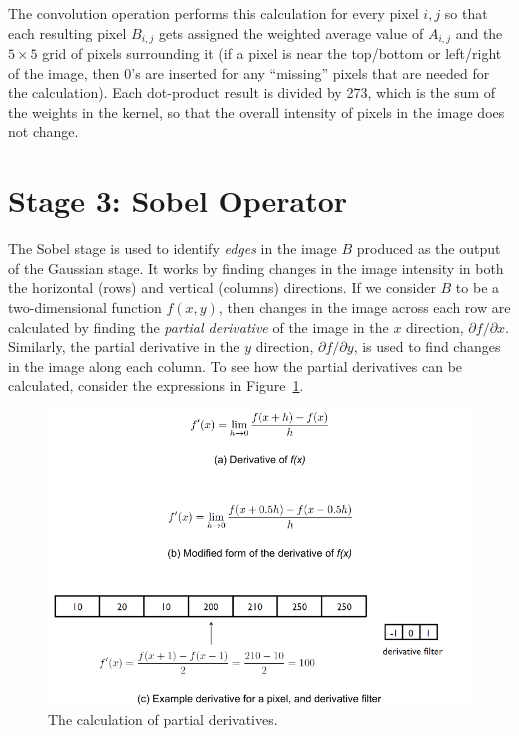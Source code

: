 \documentclass[epsfig,10pt,fullpage]{article}
\begin{document}
\noindent
The convolution operation performs this calculation for every pixel $i, j$ so that 
each resulting pixel $B_{i,j}$ gets assigned the weighted average value of $A_{i,j}$ and 
the $5 \times 5$ grid of pixels surrounding it (if a pixel is near the 
top/bottom or left/right of the image,
then 0's are inserted for any ``missing'' pixels that are needed for the calculation). Each 
dot-product result is divided by 273, which is the sum of the weights in the kernel, 
so that the overall intensity of pixels in the image does not change.

\noindent
\section*{Stage 3: Sobel Operator} 

The Sobel stage is used to identify {\it edges} in the image $B$ produced as the output of
the Gaussian stage. It works by finding changes in the image intensity in both the horizontal
(rows) and vertical (columns) directions. If we consider $B$ to be a two-dimensional
function $f(x,y)$, then changes in the image across each row are calculated by finding the 
{\it partial derivative} of the image in the $x$ direction, 
${\partial f}/{\partial x}$. Similarly, the partial derivative in the $y$ direction, 
${\partial f}/{\partial y}$, is used to find changes in the image along each column. To see 
how the partial derivatives can be calculated, consider the expressions in 
Figure~\ref{fig:derivative}. 

\begin{figure}[h]
   \begin{center}
       \includegraphics[scale = 0.85]{figures/derivative.pdf}
   \end{center}
   \caption{The calculation of partial derivatives.}
	\label{fig:derivative}
\end{figure}
\end{document}
